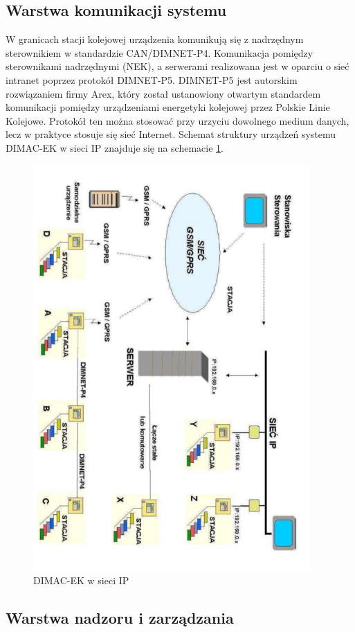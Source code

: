 \subsection{Warstwa komunikacji systemu}
W granicach stacji kolejowej urządzenia komunikują się z nadrzędnym sterownikiem w standardzie CAN/DIMNET-P4.
Komunikacja pomiędzy sterownikami nadrzędnymi (NEK), a serwerami realizowana jest w oparciu o sieć intranet poprzez protokół DIMNET-P5. DIMNET-P5 jest autorskim rozwiązaniem firmy Arex, który został ustanowiony otwartym standardem komunikacji pomiędzy urządzeniami energetyki kolejowej przez Polskie Linie Kolejowe. Protokół ten można stosować przy urzyciu dowolnego medium danych, lecz w praktyce stosuje się sieć Internet. Schemat struktury urządzeń systemu DIMAC-EK w sieci IP znajduje się na schemacie \ref{fig:dimacek_ip}.
\begin{figure}[t]
	\includegraphics[height=155mm]{./img/dimacek_ip.png}
	\caption{DIMAC-EK w sieci IP}
	\label{fig:dimacek_ip}
\end{figure}


\subsection{Warstwa nadzoru i zarządzania}

